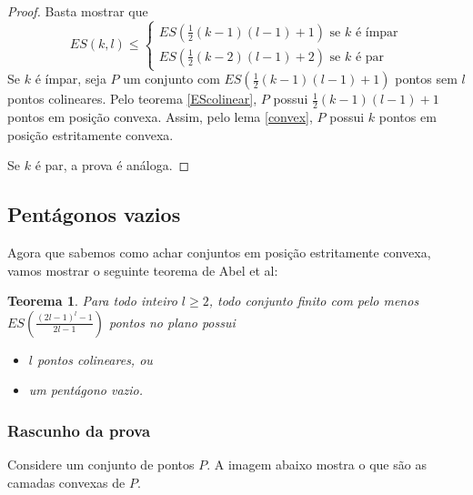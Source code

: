 \documentclass[a4paper]{book}
\newtheorem{teorema}{Teorema}
\begin{document}
\begin{proof}
    Basta mostrar que
    $$
    ES(k,l)\leq
    \begin{cases}
        ES(\frac{1}{2}(k-1)(l-1)+1) \text{ se }k\text{ é ímpar}\\
        ES(\frac{1}{2}(k-2)(l-1)+2) \text{ se }k\text{ é par}
    \end{cases}$$
    Se $k$ é ímpar, seja $P$ um conjunto com $ES(\frac{1}{2}(k-1)(l-1)+1)$ pontos sem $l$ pontos colineares. Pelo teorema \ref{EScolinear}, $P$ possui $\frac{1}{2}(k-1)(l-1)+1$ pontos em posição convexa. Assim, pelo lema \ref{convex}, $P$ possui $k$ pontos em posição estritamente convexa.

    Se $k$ é par, a prova é análoga.
\end{proof}

\subsection{Pentágonos vazios}

Agora que sabemos como achar conjuntos em posição estritamente convexa, vamos mostrar o seguinte teorema de Abel et al\cite{pentagon}:

\begin{teorema}
    Para todo inteiro $l\geq 2$, todo conjunto finito com pelo menos $ES(\frac{(2l-1)^l-1}{2l-1})$ pontos no plano possui 
    \begin{itemize}
        \item $l$ pontos colineares, ou
        \item um pentágono vazio.
    \end{itemize}
\end{teorema}
\subsubsection {Rascunho da prova}
Considere um conjunto de pontos $P$. A imagem abaixo mostra o que são as camadas convexas de $P$.

\end{document}
